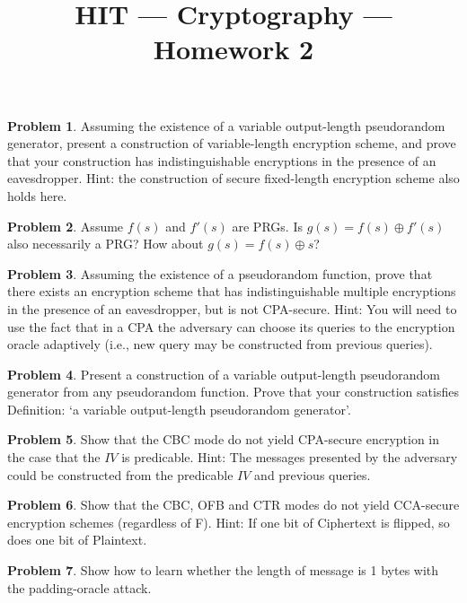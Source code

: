 \documentclass[11pt]{article}
\title{HIT --- Cryptography --- Homework 2}
\theoremstyle{definition}
\newtheorem{problem}{Problem}
\begin{document}
\maketitle

\begin{problem}
Assuming the existence of a variable output-length pseudorandom generator, present a construction of variable-length encryption scheme, and prove that your construction has indistinguishable encryptions in the presence of an eavesdropper. {\small Hint: the construction of secure fixed-length encryption scheme also holds here.}
\end{problem}

\begin{problem}
Assume $f(s)$ and $f'(s)$ are PRGs. Is $g(s)=f(s) \oplus f'(s)$ also necessarily a PRG? How about $g(s)=f(s) \oplus s$?
\end{problem}

\begin{problem}
Assuming the existence of a pseudorandom function, prove that there exists an encryption scheme that has indistinguishable multiple encryptions in the presence of an eavesdropper, but is not CPA-secure.
{\small Hint: You will need to use the fact that in a CPA the adversary can choose its queries to the encryption oracle adaptively (i.e., new query may be constructed from previous queries).}
\end{problem}


\begin{problem}
Present a construction of a variable output-length pseudorandom generator from any pseudorandom function. Prove that your construction satisfies Definition: `a variable output-length pseudorandom generator'.
\end{problem}

\begin{problem}
Show that the CBC mode do not yield CPA-secure encryption in the case that the $IV$ is predicable. {\small Hint: The messages presented by the adversary could be constructed from the predicable $IV$ and previous queries.}
\end{problem}

\begin{problem}
Show that the CBC, OFB and CTR modes do not yield CCA-secure encryption schemes (regardless of F). {\small Hint: If one bit of Ciphertext is flipped, so does one bit of Plaintext.}
\end{problem}

\begin{problem}
Show how to learn whether the length of message is 1 bytes with the padding-oracle attack. 
\end{problem}
\end{document}
